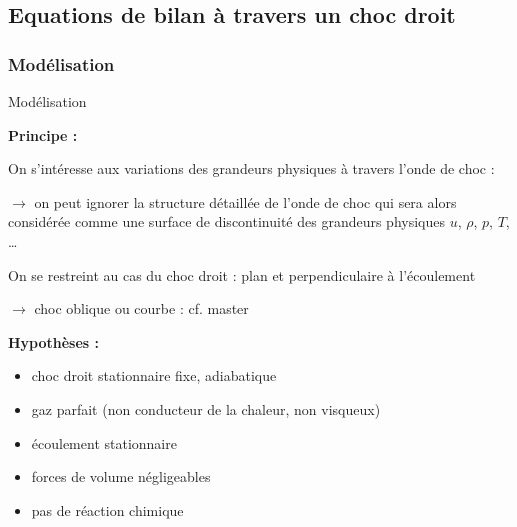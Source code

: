 \subsection{Equations de bilan à travers un choc droit}

\subsubsection{Modélisation}
\begin{frame}{Modélisation}

\small

\textbf{Principe :} \medskip

On s'intéresse aux variations des grandeurs physiques à travers l'onde de choc :

\medskip

$\rightarrow$ 
on peut ignorer la structure détaillée de l'onde de choc qui sera alors considérée 
\mytabbing{$\rightarrow$} 
comme une \textcolor{vert}{surface de discontinuité} des grandeurs physiques
$u$, $\rho$, $p$, $T$, \ldots

\bigskip \pause

On se restreint au cas du choc droit : plan et perpendiculaire à l'écoulement 

\smallskip
\hfill {\color{gris}$\rightarrow$ choc oblique ou courbe : cf. master}

\bigskip 

\pause

\textbf{Hypothèses :}

\begin{itemize}
\item
choc droit stationnaire fixe, adiabatique
\item
gaz parfait (non conducteur de la chaleur, non visqueux)
\item
écoulement stationnaire
\item
forces de volume négligeables
\item
pas de réaction chimique
\end{itemize}

\vspace{5mm}

\end{frame}

